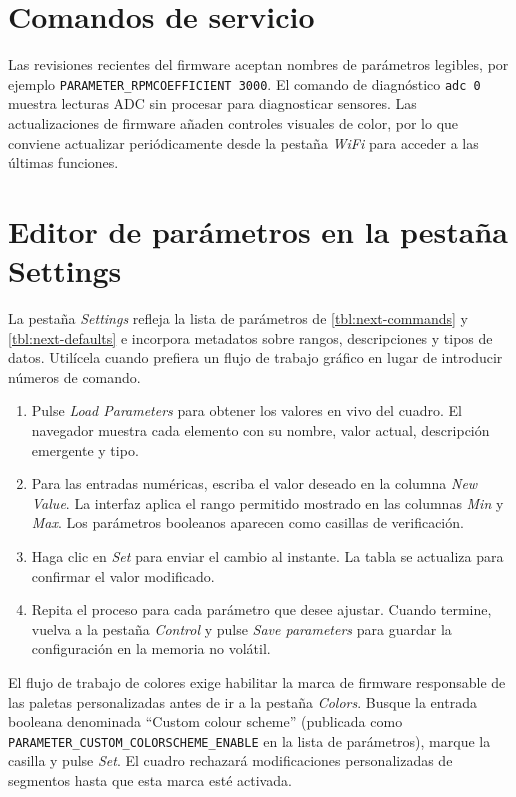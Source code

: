 \section{Comandos de servicio}
Las revisiones recientes del firmware aceptan nombres de parámetros legibles, por ejemplo \verb|PARAMETER_RPMCOEFFICIENT 3000|. El comando de diagnóstico \verb|adc 0| muestra lecturas ADC sin procesar para diagnosticar sensores. Las actualizaciones de firmware añaden controles visuales de color, por lo que conviene actualizar periódicamente desde la pestaña \emph{WiFi} para acceder a las últimas funciones.

\section{Editor de parámetros en la pestaña Settings}
La pestaña \emph{Settings} refleja la lista de parámetros de \autoref{tbl:next-commands} y \autoref{tbl:next-defaults} e incorpora metadatos sobre rangos, descripciones y tipos de datos.
Utilícela cuando prefiera un flujo de trabajo gráfico en lugar de introducir números de comando.

\begin{enumerate}
    \item Pulse \emph{Load Parameters} para obtener los valores en vivo del cuadro. El navegador muestra cada elemento con su nombre, valor actual, descripción emergente y tipo.
    \item Para las entradas numéricas, escriba el valor deseado en la columna \emph{New Value}. La interfaz aplica el rango permitido mostrado en las columnas \emph{Min} y \emph{Max}. Los parámetros booleanos aparecen como casillas de verificación.
    \item Haga clic en \emph{Set} para enviar el cambio al instante. La tabla se actualiza para confirmar el valor modificado.
    \item Repita el proceso para cada parámetro que desee ajustar. Cuando termine, vuelva a la pestaña \emph{Control} y pulse \emph{Save parameters} para guardar la configuración en la memoria no volátil.
\end{enumerate}

El flujo de trabajo de colores exige habilitar la marca de firmware responsable de las paletas personalizadas antes de ir a la pestaña \emph{Colors}.
Busque la entrada booleana denominada “Custom colour scheme” (publicada como \verb|PARAMETER_CUSTOM_COLORSCHEME_ENABLE| en la lista de parámetros), marque la casilla y pulse \emph{Set}. El cuadro rechazará modificaciones personalizadas de segmentos hasta que esta marca esté activada.

